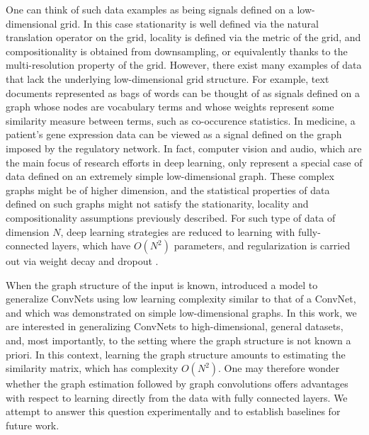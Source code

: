 \documentclass{article} %
\begin{document}
%
%
% 
One can think of such data examples as being signals defined on a low-dimensional grid. In this case stationarity is well defined via the natural translation 
operator on the grid, locality is defined via the metric of the grid, and compositionality is obtained from downsampling, or equivalently thanks to the multi-resolution property of the grid.
However, there exist many examples of data that lack the underlying low-dimensional grid structure. 
For example, text documents represented as bags of words can be thought of as signals defined on a graph whose nodes are vocabulary terms and whose weights represent some similarity measure between terms, such as co-occurence statistics. In medicine, a patient's gene expression data can be viewed as a signal defined on the graph imposed by the regulatory network. In fact, computer vision and audio, which are the main focus of research efforts in deep learning, only represent a special case of data defined on an extremely simple low-dimensional graph. These complex graphs might be of higher dimension, and the statistical properties of data defined on such graphs might not satisfy the stationarity, locality and compositionality assumptions previously described.
For such type of data of dimension $N$, deep learning strategies are reduced to learning with fully-connected layers, which have $O(N^2)$ parameters, and regularization is carried out via weight decay and dropout \cite{srivastava2014dropout}.

When the graph structure of the input is known, \cite{spectralnet2013} introduced a model to generalize ConvNets using low learning complexity similar to that of a ConvNet, and which was demonstrated on simple low-dimensional graphs. In this work, we are interested in generalizing ConvNets to high-dimensional, general datasets,  and, most importantly, to the setting where the graph structure is not known a priori. In this context, learning the graph structure amounts to estimating the similarity matrix, which has complexity $O(N^2)$. One may therefore wonder whether the graph estimation followed by graph convolutions offers advantages with respect to learning directly from the data with fully connected layers. We attempt to answer this question experimentally and to establish baselines for future work. 
 
\end{document}
